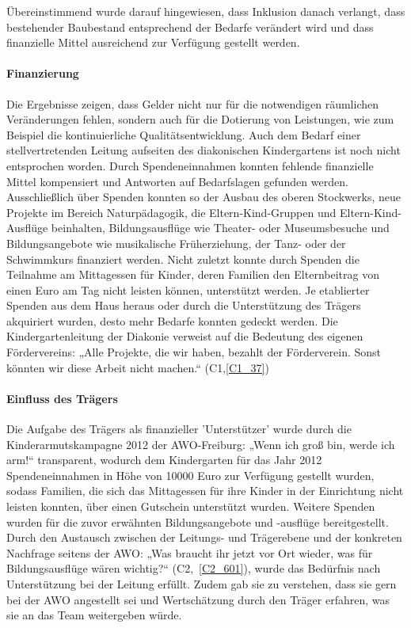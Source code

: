 Übereinstimmend wurde darauf hingewiesen, dass Inklusion danach verlangt, dass bestehender Baubestand entsprechend der Bedarfe verändert wird und dass finanzielle Mittel ausreichend zur Verfügung gestellt werden. 
 
\paragraph{Finanzierung}
Die Ergebnisse zeigen, dass Gelder nicht nur für die notwendigen räumlichen Veränderungen fehlen, sondern auch für die Dotierung von Leistungen, wie zum Beispiel die kontinuierliche Qualitätsentwicklung.  Auch dem Bedarf einer stellvertretenden Leitung aufseiten des diakonischen Kindergartens ist noch nicht entsprochen worden. 
Durch Spendeneinnahmen konnten fehlende finanzielle Mittel kompensiert und Antworten auf Bedarfslagen gefunden werden. Ausschließlich über Spenden konnten so der Ausbau des oberen Stockwerks, neue Projekte im Bereich Naturpädagogik, die Eltern-Kind-Gruppen und Eltern-Kind-Ausflüge beinhalten, Bildungsausflüge wie Theater- oder Museumsbesuche und Bildungsangebote wie musikalische Früherziehung, der Tanz- oder der Schwimmkurs finanziert werden. Nicht zuletzt konnte durch Spenden die Teilnahme am Mittagessen für Kinder, deren Familien den Elternbeitrag von einen Euro am Tag nicht leisten können, unterstützt werden.
Je etablierter Spenden aus dem Haus heraus oder durch die Unterstützung des Trägers akquiriert wurden, desto mehr Bedarfe konnten gedeckt werden. Die Kindergartenleitung der Diakonie verweist auf die Bedeutung des eigenen Fördervereins: „Alle Projekte, die wir haben, bezahlt der Förderverein. Sonst könnten wir diese Arbeit nicht machen.“ (C1,\ref{C1_37})

\paragraph{Einfluss des Trägers}
Die Aufgabe des Trägers als finanzieller 'Unterstützer' wurde durch die Kinderarmutskampagne 2012 der AWO-Freiburg: „Wenn ich groß bin, werde ich arm!“ transparent, wodurch dem Kindergarten für das Jahr 2012 Spendeneinnahmen in Höhe von 10000 Euro zur Verfügung gestellt wurden, sodass Familien, die sich das Mittagessen für ihre Kinder in der Einrichtung nicht leisten konnten, über einen Gutschein unterstützt wurden. Weitere Spenden wurden für die zuvor erwähnten Bildungsangebote und -ausflüge bereitgestellt. Durch den Austausch zwischen der Leitungs- und Trägerebene und der konkreten Nachfrage seitens der AWO: „Was braucht ihr jetzt vor Ort wieder, was für Bildungsausflüge wären wichtig?“ (C2,~\ref{C2_601}), wurde das Bedürfnis nach Unterstützung bei der Leitung erfüllt. Zudem gab sie zu verstehen, dass sie gern bei der AWO angestellt sei und Wertschätzung durch den Träger erfahren, was sie an das Team weitergeben würde.

